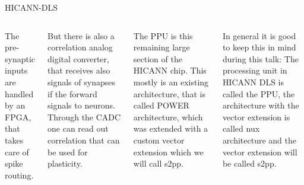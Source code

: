 \documentclass[10pt,aspectratio=169]{beamer}
\begin{document}
\begin{frame}{HICANN-DLS}
\begin{columns}[c]
{        The pre-synaptic inputs are handled by an FPGA, that takes care of spike routing.
        
        But there is also a correlation analog digital converter, that receives also signals of synapses if the forward signals to neurons.
        Through the CADC one can read out correlation that can be used for plasticity.

        The PPU is this remaining large section of the HICANN chip.
		This mostly is an existing architecture, that is called POWER architecture, which was extended with a custom vector extension which we will call s2pp.

		In general it is good to keep this in mind during this talk:
		The processing unit in HICANN DLS is called the PPU, the architecture with the vector extension is called nux architecture and the vector extension will be called s2pp.

}
    \end{columns}
\end{frame}
\end{document}
